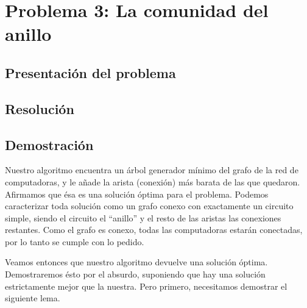 \section{Problema 3: La comunidad del anillo}

\subsection{Presentación del problema}

\subsection{Resolución}

\subsection{Demostración}

Nuestro algoritmo encuentra un árbol generador mínimo del grafo de la red de computadoras, y le añade la arista (conexión) más barata de las que quedaron. Afirmamos que ésa es una solución óptima para el problema. Podemos caracterizar toda solución como un grafo conexo con exactamente un circuito simple, siendo el circuito el ``anillo'' y el resto de las aristas las conexiones restantes. Como el grafo es conexo, todas las computadoras estarán conectadas, por lo tanto se cumple con lo pedido.

Veamos entonces que nuestro algoritmo devuelve una solución óptima. Demostraremos ésto por el absurdo, suponiendo que hay una solución estrictamente mejor que la nuestra. Pero primero, necesitamos demostrar el siguiente lema.

